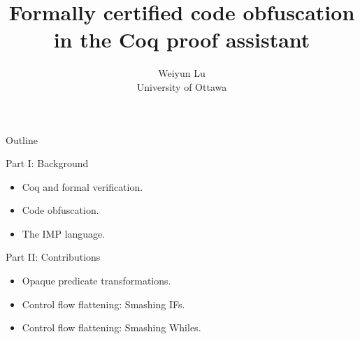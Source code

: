 \documentclass[10pt,handout]{beamer}
\title{Formally certified code obfuscation \\ in the Coq proof assistant}
\author{Weiyun Lu \\ University of Ottawa}
\theoremstyle{plain}
\theoremstyle{definition}
\begin{document}
\begin{frame}[plain] %
  \titlepage
\end{frame}



\begin{frame}{Outline} %

Part I: Background
\begin{itemize}
	\item Coq and formal verification.
	\item Code obfuscation.
	\item The IMP language.
\end{itemize}
\par\medskip
Part II: Contributions
\begin{itemize}
    \item Opaque predicate transformations.
    \item Control flow flattening: Smashing IFs.
    \item Control flow flattening: Smashing Whiles.
\end{itemize}

\end{frame}
\end{document}
